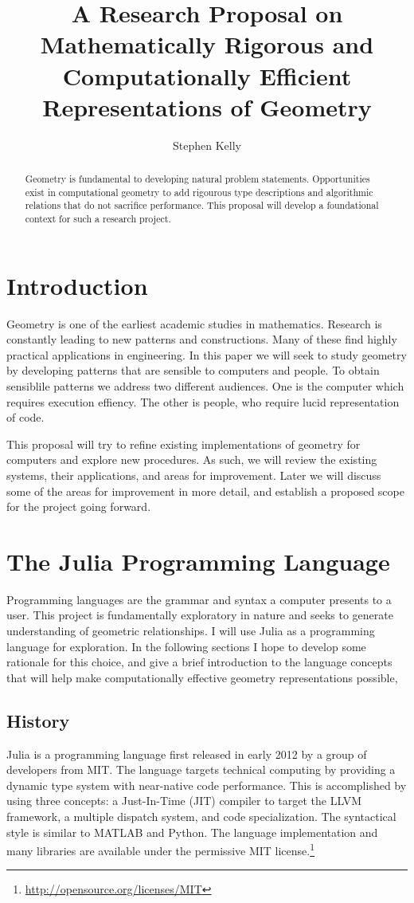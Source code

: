 \documentclass[a4paper]{article}
\title{A Research Proposal on Mathematically Rigorous and Computationally
Efficient Representations of Geometry}
\author{Stephen Kelly}
\begin{document}
\maketitle

\begin{abstract}
Geometry is fundamental to developing natural problem statements.
Opportunities exist in computational geometry to
add rigourous type descriptions and algorithmic relations that do not
sacrifice performance. This proposal will develop a foundational context
for such a research project.
\end{abstract}

\section{Introduction}

Geometry is one of the earliest academic studies in mathematics. Research is
constantly leading to new patterns and constructions. Many of these find
highly practical applications in engineering. In this paper we will seek to
study geometry by developing patterns that are sensible to computers and people.
To obtain sensiblile patterns we address two different audiences.
One is the computer which requires execution effiency. The other is people,
who require lucid representation of code.

This proposal will try to refine existing implementations of geometry for
computers and explore new procedures. As such, we will review the existing
systems, their applications, and areas for improvement. Later we will discuss
some of the areas for improvement in more detail, and establish a proposed
scope for the project going forward.


\section{The Julia Programming Language}

Programming languages are the grammar and syntax a computer presents to a user.
This project is fundamentally exploratory in nature and seeks to generate
understanding of geometric relationships. I will use Julia as a programming
language for exploration. In the following sections I hope to develop some
rationale for this choice, and give a brief introduction to the language
concepts that will help make computationally effective geometry representations
possible,

\subsection{History}
Julia is a programming language first released in early 2012 by a group of
developers from MIT. The language targets technical computing by providing a
dynamic type system with near-native code performance. This is accomplished by
using three concepts: a Just-In-Time (JIT) compiler to target the LLVM framework,
a multiple dispatch system, and code specialization.\cite{bezanson2012julia}
The syntactical style is similar to MATLAB and Python.
The language implementation and many libraries are available under the
permissive MIT license.\footnote{\url{http://opensource.org/licenses/MIT}}
\end{document}
